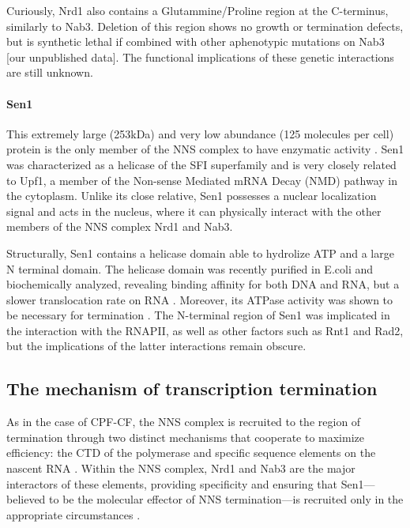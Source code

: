 Curiously, Nrd1 also contains a Glutammine/Proline region at the C-terminus, similarly to Nab3. 
Deletion of this region shows no growth or termination defects, but is synthetic lethal if combined with other aphenotypic mutations on Nab3 [our unpublished data]. 
The functional implications of these genetic interactions are still unknown.
 

\paragraph{Sen1}

This extremely large (253kDa) and very low abundance (125 molecules per cell) protein is the only member of the NNS complex to have enzymatic activity \cite{steinmetz:1996:repression}. 
Sen1 was characterized as a helicase of the SFI superfamily and is very closely related to Upf1, a member of the Non-sense Mediated mRNA Decay (NMD) pathway in the cytoplasm. 
Unlike its close relative, Sen1 possesses a nuclear localization signal and acts in the nucleus, where it can physically interact with the other members of the NNS complex Nrd1 and Nab3. 

Structurally, Sen1 contains a helicase domain able to hydrolize ATP and a large N terminal domain. 
The helicase domain was recently purified in E.coli and biochemically analyzed, revealing binding affinity for both DNA and RNA, but a slower translocation rate on RNA \cite{martintumasz:2015:saccharomyces}. 
Moreover, its ATPase activity was shown to be necessary for termination \invitro{} \cite{porrua:2013:bacteriallike}. 
The N-terminal region of Sen1 was implicated in the interaction with the RNAPII, as well as other factors such as Rnt1 and Rad2, but the implications of the latter interactions remain obscure.

\subsection{The mechanism of transcription termination}

As in the case of CPF-CF, the NNS complex is recruited to the region of termination through two distinct mechanisms that cooperate to maximize efficiency: the CTD of the polymerase \cite{vasiljeva:2008:nrd1nab3sen1} and specific sequence elements on the nascent RNA \cite{conrad:2000:yeast}. 
Within the NNS complex, Nrd1 and Nab3 are the major interactors of these elements, providing specificity and ensuring that Sen1---believed to be the molecular effector of NNS termination---is recruited only in the appropriate circumstances \cite{porrua:2013:bacteriallike}.

